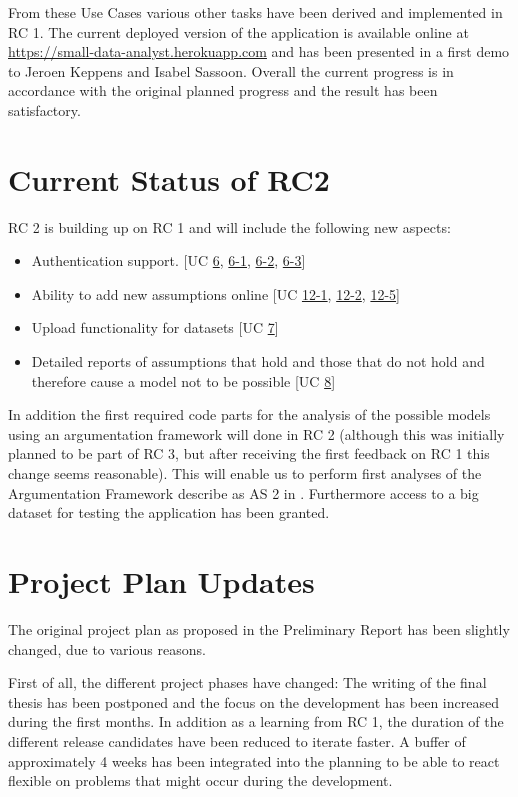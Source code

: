 \documentclass[11pt,twocolumn]{article}
\begin{document}
From these Use Cases various other tasks have been derived and implemented in RC 1. The current deployed version of the application is available online at \href{https://small-data-analyst.herokuapp.com}{https://small-data-analyst.herokuapp.com} and has been presented in a first demo to Jeroen Keppens and Isabel Sassoon. Overall the current progress is in accordance with the original planned progress and the result has been satisfactory.

\section{ Current Status of RC2}
RC 2 is building up on RC 1 and will include the following new aspects:
\begin{itemize}
	\item Authentication support. [UC \href{https://trello.com/c/CVGBVWID}{6}, \href{https://trello.com/c/pId27kJM}{6-1}, \href{https://trello.com/c/pQ98qgSL}{6-2}, \href{https://trello.com/c/mvxBeNSR}{6-3}]
	\item Ability to add new assumptions online [UC \href{https://trello.com/c/2V6Cl65u}{12-1}, \href{https://trello.com/c/OwM2Z7wt}{12-2}, \href{https://trello.com/c/Rg6GPnNE}{12-5}]
	\item Upload functionality for datasets [UC \href{https://trello.com/c/DidVQKAS}{7}]
	\item Detailed reports of assumptions that hold and those that do not hold and therefore cause a model not to be possible [UC \href{https://trello.com/c/be2088JH}{8}]
\end{itemize}

In addition the first required code parts for the analysis of the possible models using an argumentation framework will done in RC 2 (although this was initially planned to be part of RC 3, but after receiving the first feedback on RC 1 this change seems reasonable). This will enable us to perform first analyses of the Argumentation Framework describe as AS 2 in \cite{sassoon2014}. Furthermore access to a big dataset for testing the application has been granted.

\section{ Project Plan Updates}

The original project plan as proposed in the Preliminary Report has been slightly changed, due to various reasons. 

First of all, the different project phases have changed: The writing of the final thesis has been postponed and the focus on the development has been increased during the first months. 
In addition as a learning from RC 1, the duration of the different release candidates have been reduced to iterate faster. A buffer of approximately 4 weeks has been integrated into the planning to be able to react flexible on problems that might occur during the development. 
\end{document}
